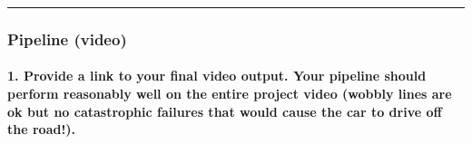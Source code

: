 \documentclass[11pt]{article}
\begin{document}
    \begin{center}
    \end{center}
    { \hspace*{\fill} \\}
    
    \begin{center}
    \end{center}
    { \hspace*{\fill} \\}
    
    \begin{center}
    \end{center}
    { \hspace*{\fill} \\}
    
    \begin{center}
    \end{center}
    { \hspace*{\fill} \\}
    
    \begin{center}
    \end{center}
    { \hspace*{\fill} \\}
    
    \begin{center}\rule{0.5\linewidth}{\linethickness}\end{center}

\hypertarget{pipeline-video}{%
\subsubsection{Pipeline (video)}\label{pipeline-video}}

\hypertarget{provide-a-link-to-your-final-video-output.-your-pipeline-should-perform-reasonably-well-on-the-entire-project-video-wobbly-lines-are-ok-but-no-catastrophic-failures-that-would-cause-the-car-to-drive-off-the-road.}{%
\paragraph{1. Provide a link to your final video output. Your pipeline
should perform reasonably well on the entire project video (wobbly lines
are ok but no catastrophic failures that would cause the car to drive
off the
road!).}\label{provide-a-link-to-your-final-video-output.-your-pipeline-should-perform-reasonably-well-on-the-entire-project-video-wobbly-lines-are-ok-but-no-catastrophic-failures-that-would-cause-the-car-to-drive-off-the-road.}}
\end{document}
